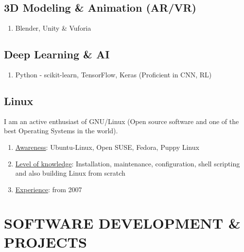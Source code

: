 \documentclass[10pt]{article}
\begin{document}
\begin{multicols}{2}
\subsection{3D Modeling \& Animation (AR/VR)}

\begin{enumerate}
\item Blender, Unity \& Vuforia

\end{enumerate} 

\subsection{Deep Learning \& AI}

\begin{enumerate}
\item Python - scikit-learn, TensorFlow, Keras (Proficient in CNN, RL)
\end{enumerate}

\subsection{Linux} I am an active enthusiast of GNU/Linux (Open source software and one of the best Operating Systems in the world).
\begin{enumerate} \item \underline{Awareness}:	Ubuntu-Linux, Open SUSE, Fedora, Puppy Linux \item \underline{Level of knowledge}:	Installation, maintenance, configuration, shell scripting and also building Linux from scratch \item \underline{Experience}: from 2007 \end{enumerate} 

\end{multicols}

\section{SOFTWARE DEVELOPMENT \& PROJECTS} \hline \vspace{0.5cm}
\end{document}
